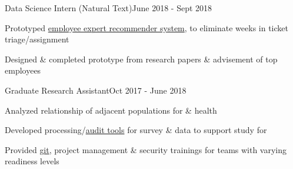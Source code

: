 \documentclass{article}
\newenvironment{**mylist}[2]{

\subsubsection*{#1\hfill#2}
  \small
  \begin{list}{}{}
    \setlength{\topsep}{.2pt}
   \setlength{\itemsep}{.8pt}
   \setlength{\parskip}{0pt}
   \setlength{\parsep}{0pt}}{\end{list}\normalsize}
\newcommand{\LU}[1]{\hspace{-1em}{\bf Technologies : #1}}
\def\PT{{\bf(Part Time)}\xspace}
\def\grd{Graduate\xspace}
\begin{document}
\begin{comment}
\begin{**mylist}{\censor{\href{www.thinkful.com}{Thinkful}} \PT \tabb Data Science Technical Expert}{Jan 2019 - March 2019}
\item Provided safe environment for training \& instruction in a remote-first setting
\item Advised career transitioners in mastery of professional \& data science topics
\end{**mylist}
\end{comment}

\begin{**mylist}{ \tabb Data Science Intern (Natural Text)}{June 2018 - Sept 2018}
\item Prototyped \href{https://www.youtube.com/watch?v=_Oa4aSXjzhs}{employee expert recommender system}, to eliminate weeks in ticket triage/assignment
\item Designed \& completed prototype from research papers \& advisement of top  employees
\end{**mylist}


\begin{**mylist}{ \tabb \grd Research Assistant}{Oct 2017 - June 2018}
\item Analyzed relationship of adjacent  populations for  \&  health
\item Developed processing/\href{https://gitlab.com/Fair_lab/HCPVaTT}{audit tools} for survey \&  data to support \href{https://abcdstudy.org/study-sites/ohsu/}{}  study for 
\item Provided \href{https://github.com/probinso/ABC}{git}, project management \& security trainings for teams with varying readiness levels
\end{**mylist}
\end{document}
